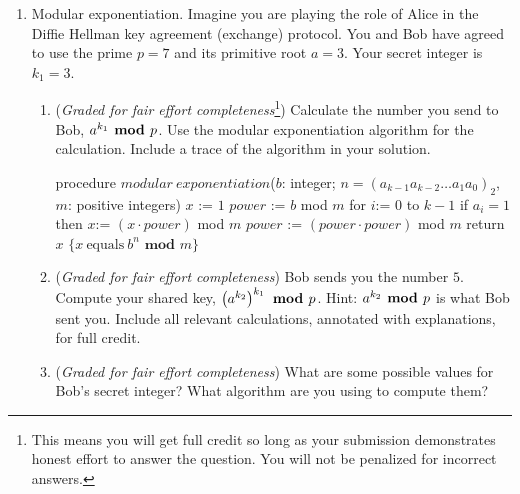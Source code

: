 \documentclass[12pt, oneside]{article}
\newcommand{\gradeCorrect}{({\it Graded for correctness}) }
\newcommand{\gradeComplete}{({\it Graded for completeness}) }
\begin{document}
\begin{enumerate}[labelindent=0pt, leftmargin=0pt]
    Recall that the {\bf equivalence class} of an element $x \in X$ for an equivalence relation $\sim$ on the set $X$ 
    is the set $\{s \in X | (x, s) \in \sim \}$. We write this as $[x]_\sim$.
    
    \begin{enumerate}
        \item\gradeCorrect Find a ratings $5$-tuple $v$ such that $[v]_{G} = \{v \}$. Justify your choice of $v$.
        \item\gradeComplete Find distinct ratings $5$-tuples $u_1, u_2$ ($u_1 \neq u_2$) whose equivalence classes $[u_1]_{G}$ and $[u_2]_{G}$ have the same size.
        \item\gradeComplete Find distinct ratings $5$-tuples $w_1, w_2$ ($w_1 \neq w_2$) whose equivalence classes $[w_1]_{G}$ and $[w_2]_{G}$ have different sizes.
    \end{enumerate}


    \item Modular exponentiation.
    Imagine you are playing the role of Alice in the Diffie Hellman key agreement (exchange) protocol.  
    You and Bob have agreed to use the prime $p = 7$ and its primitive root $a = 3$.
    Your secret integer is $k_1 = 3$.
        
        \begin{enumerate}
        \item  ({\it Graded for fair effort completeness}\footnote{This means 
        you will get full credit so long as your submission demonstrates honest 
        effort to answer the question. You will not be penalized for incorrect answers.}) 
        Calculate the number you send to Bob, 
        $a^{k_1} \textrm{\bf ~mod~} p$.  Use the modular exponentiation algorithm
        for the calculation. Include a trace of the algorithm in your solution.

        

\begin{algorithm}[caption={Modular Exponentation}]
    procedure $modular~exponentiation$($b$: integer; 
                 $n = (a_{k-1}a_{k-2} \ldots a_1 a_0)_2$, $m$: positive integers)
    $x$ := $1$
    $power$ := $b$ mod $m$
    for $i$:= $0$ to $k-1$
      if $a_i = 1$ then $x$:= $(x \cdot power)$ mod $m$
      $power$ := $(power \cdot power)$ mod $m$
    return $x$ $\{x~\textrm{equals}~b^n \textbf{ mod } m\} $
\end{algorithm}         
        \item  ({\it Graded for fair effort completeness}) Bob sends you the number $5$. Compute  your shared key, $\left(a^{k_2}\right)^{k_1}  
        \textrm{\bf ~mod~} p$.
        Hint: $a^{k_2} \textrm{\bf ~mod~} p$ is what Bob sent you.  Include all relevant calculations, annotated with explanations, 
        for full credit.
        
        
        \item ({\it Graded for fair effort completeness}) What are some possible values for Bob's secret integer?  What 
        algorithm are you using to compute them?
        \end{enumerate}


    \end{enumerate}
\end{document}
